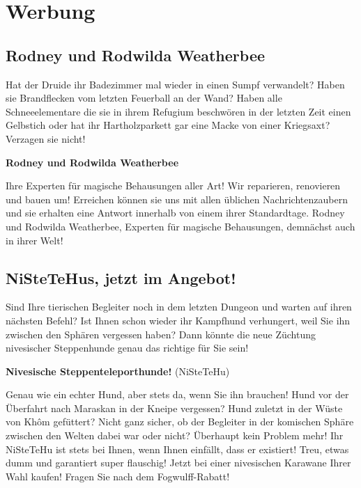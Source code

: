 \documentclass[final]{multiversum}
\begin{document}
\section{Werbung}
\subsection{Rodney und Rodwilda Weatherbee}
Hat der Druide ihr Badezimmer mal wieder in einen Sumpf verwandelt?  Haben sie
Brandflecken vom letzten Feuerball an der Wand? Haben alle Schneeelementare die
sie in ihrem Refugium beschwören in der letzten Zeit einen Gelbstich oder hat
ihr Hartholzparkett gar eine Macke von einer Kriegsaxt? Verzagen sie nicht!

\bigskip

\centerline{\textbf{Rodney und Rodwilda Weatherbee}}

\bigskip

Ihre Experten für magische Behausungen aller Art!
Wir reparieren, renovieren und bauen um!  Erreichen können sie uns mit allen
üblichen Nachrichtenzaubern und sie erhalten eine Antwort innerhalb von einem
ihrer Standardtage.  Rodney und Rodwilda Weatherbee, Experten für magische
Behausungen, demnächst auch in ihrer Welt!

\subsection{NiSteTeHus, jetzt im Angebot!}
Sind Ihre tierischen Begleiter noch in dem letzten Dungeon und warten auf ihren
nächsten Befehl?  Ist Ihnen schon wieder ihr Kampfhund verhungert, weil Sie ihn
zwischen den Sphären vergessen haben?  Dann könnte die neue Züchtung nivesischer
Steppenhunde genau das richtige für Sie sein!  

\bigskip

\centerline{\textbf{Nivesische Steppenteleporthunde!}
{\footnotesize(NiSteTeHu)}}

\bigskip

Genau wie ein echter Hund, aber stets da, wenn Sie ihn brauchen!
Hund vor der Überfahrt nach Maraskan in der Kneipe vergessen?  Hund zuletzt in
der Wüste von Khôm gefüttert?  Nicht ganz sicher, ob der Begleiter in der
komischen Sphäre zwischen den Welten dabei war oder nicht? Überhaupt kein
Problem mehr!  Ihr NiSteTeHu ist stets bei Ihnen, wenn Ihnen einfällt, dass er
existiert!  Treu, etwas dumm und garantiert super flauschig!  Jetzt bei einer
nivesischen Karawane Ihrer Wahl kaufen! Fragen Sie nach dem Fogwulff-Rabatt!
\end{document}
